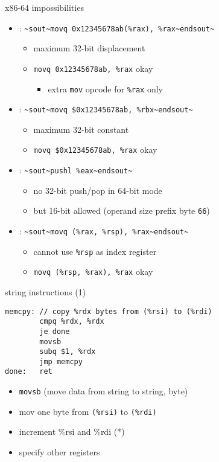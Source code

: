 \begin{frame}[fragile,label=x8664impos]{x86-64 impossibilities}
    \begin{itemize}
    \item {}: \lstinline|~sout~movq 0x12345678ab(%rax), %rax~endsout~|
        \begin{itemize}
        \item maximum 32-bit displacement
        \item \lstinline|movq 0x12345678ab, %rax| okay
            \begin{itemize}
            \item extra {\tt mov} opcode for {\tt \%rax} only
            \end{itemize}
        \end{itemize}
    \item {}: \lstinline|~sout~movq $0x12345678ab, %rbx~endsout~|
        \begin{itemize}
        \item maximum 32-bit constant
        \item \lstinline|movq $0x12345678ab, %rax| okay
        \end{itemize}
    \item {}: \lstinline|~sout~pushl %eax~endsout~|
        \begin{itemize}
        \item no 32-bit push/pop in 64-bit mode
        \item but 16-bit allowed (operand size prefix byte {\tt 66})
        \end{itemize}
    \item {}: \lstinline|~sout~movq (%rax, %rsp), %rax~endsout~|
        \begin{itemize}
        \item cannot use \lstinline|%rsp| as index register
        \item \lstinline|movq (%rsp, %rax), %rax| okay
        \end{itemize}
    \end{itemize}
\end{frame}


\begin{frame}[fragile,label=string1]{string instructions (1)}
\begin{lstlisting}[style=small]
memcpy: // copy %rdx bytes from (%rsi) to (%rdi)
        cmpq %rdx, %rdx
        je done
        movsb
        subq $1, %rdx
        jmp memcpy
done:   ret
\end{lstlisting}
\begin{itemize}
\item {\tt movsb} (move data from string to string, byte)
\item mov one byte from {\tt (\%rsi)} to {\tt (\%rdi)}
\item increment \%rsi and \%rdi (*)
\item {} specify other registers
\end{itemize}
\end{frame}

